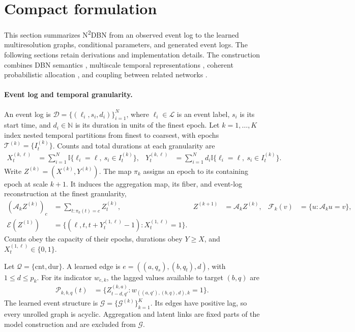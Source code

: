 \section{Compact formulation}
\label{sec:model}

This section summarizes N\textsuperscript{2}DBN from an observed event log to
the learned multiresolution graphs, conditional parameters, and generated
event logs. The following sections retain derivations and implementation
details. The construction combines DBN semantics
\citep{dean1989model,murphy2002dbn}, multiscale temporal representations
\citep{saria2007granularity,kang2022multiscale}, coherent probabilistic
allocation \citep{das_topdown2023}, and coupling between related networks
\citep{grzegorczyk2012globalcoupling,kamalabad2020edgewise}.

\paragraph{Event log and temporal granularity.}
\label{sec:model_scales}

An event log is
\(\mathcal D=\{(\ell_i,s_i,d_i)\}_{i=1}^N\), where \(\ell_i\in\mathcal L\)
is an event label, \(s_i\) is its start time, and \(d_i\in\mathbb N\) is its
duration in units of the finest epoch. Let \(k=1,\ldots,K\) index nested
temporal partitions from finest to coarsest, with epochs
\(\mathcal T^{(k)}=\{I_t^{(k)}\}\). Counts and total durations at each
granularity are
\begin{align}
 X_t^{(k,\ell)}
 &=\sum_{i=1}^N\mathbb{I}\{\ell_i=\ell,\ s_i\in I_t^{(k)}\},
 &Y_t^{(k,\ell)}
 &=\sum_{i=1}^Nd_i\mathbb{I}\{\ell_i=\ell,\ s_i\in I_t^{(k)}\}.
 \label{eq:model_log_projection}
\end{align}
Write \(Z^{(k)}=(X^{(k)},Y^{(k)})\). The map \(\pi_k\) assigns an epoch to
its containing epoch at scale \(k+1\). It induces the aggregation map, its
fiber, and event-log reconstruction at the finest granularity,
\begin{align}
 (\mathcal A_kZ^{(k)})_c
 &=\sum_{t:\pi_k(t)=c}Z_t^{(k)},
 &Z^{(k+1)}&=\mathcal A_kZ^{(k)},
 &\mathcal F_k(v)&=\{u:\mathcal A_ku=v\},
 \label{eq:model_aggregation}\\
 \mathcal E(Z^{(1)})
 &=\{(\ell,t,t+Y_t^{(1,\ell)}-1):X_t^{(1,\ell)}=1\}.
 \label{eq:model_episode}
\end{align}
Counts obey the capacity of their epochs, durations obey \(Y\geq X\), and
\(X_t^{(1,\ell)}\in\{0,1\}\).

Let \(\mathcal Q=\{\mathrm{cnt},\mathrm{dur}\}\). A learned edge is
\(e=((a,q_s),(b,q_t),d)\), with \(1\leq d\leq p_k\). For its indicator
\(w_{e,k}\), the lagged values available to target \((b,q)\) are
\begin{align}
 \mathcal P_{k,b,q}(t)
 &=\{Z_{t-d,q'}^{(k,a)}:w_{((a,q'),(b,q),d),k}=1\}.
 \label{eq:model_lag_values}
\end{align}
The learned event structure is
\(\mathcal G=\{\mathcal G^{(k)}\}_{k=1}^K\). Its edges have positive lag, so
every unrolled graph is acyclic. Aggregation and latent links are fixed parts
of the model construction and are excluded from \(\mathcal G\).

